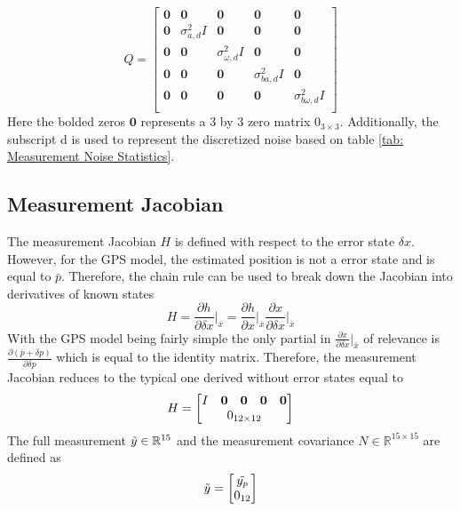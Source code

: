 \begin{equation}
    Q = \begin{bmatrix}
        \mathbf{0} & \mathbf{0} & \mathbf{0} & \mathbf{0} & \mathbf{0} \\
        \mathbf{0} & \sigma_{a,d}^2 I& \mathbf{0} & \mathbf{0} & \mathbf{0} \\
        \mathbf{0} & \mathbf{0} & \sigma_{\omega,d}^2 I & \mathbf{0} & \mathbf{0} \\
        \mathbf{0} & \mathbf{0} & \mathbf{0} & \sigma_{ba,d}^2 I  & \mathbf{0} \\
        \mathbf{0} & \mathbf{0} & \mathbf{0} & \mathbf{0} & \sigma_{b \omega,d}^2 I  \\
    \end{bmatrix}
    \label{eq: quaternion Q}
\end{equation}
Here the bolded zeros $\mathbf{0}$ represents a 3 by 3 zero matrix $0_{3 \times 3}$. Additionally, the subscript d is used to represent the discretized noise based on table \eqref{tab: Measurement Noise Statistics}.

\subsection{Measurement Jacobian}

The measurement Jacobian $H$ is defined with respect to the error state $\delta x$. However, for the GPS model, the estimated position is not a error state and is equal to $\bar{p}$. Therefore, the chain rule can be used to break down the Jacobian into 
derivatives of known states \cite{Quaternion_Kinematics_for_the_Error-state_EKF}
\begin{equation}
    H = \frac{\partial h}{\partial \delta x} \bigg|_{\bar{x}} = \frac{\partial h}{\partial x} \bigg|_{\bar{x}} \frac{\partial x}{\partial \delta x} \bigg|_{\bar{x}} 
    \label{eq: H quaternion}
\end{equation}
With the GPS model being fairly simple the only partial in $ \frac{\partial x}{\partial \delta x} |_{\bar{x}}$ of relevance is $\frac{\partial (\bar{p} + \delta p)}{\partial \delta p}$ which is equal to the identity matrix. Therefore, the measurement Jacobian reduces to the typical one derived without error states equal to 
\begin{equation}
    H = \begin{bmatrix}
        I & \mathbf{0} & \mathbf{0} & \mathbf{0} & \mathbf{0} \\
        \multicolumn{5}{c}{0_{12 \times 12}}
        \end{bmatrix}
    \label{eq: H quaternion full}
\end{equation}
The full measurement $\Tilde{y} \in \mathbb{R}^{15}$ and the measurement covariance $N \in \mathbb{R}^{15 \times 15}$ are defined as
\begin{equation}
    \Tilde{y} = \begin{bmatrix}
        \Tilde{y_p} \\
        0_{12}
    \end{bmatrix}
    \label{eq: y tilde quaternion}
\end{equation}

